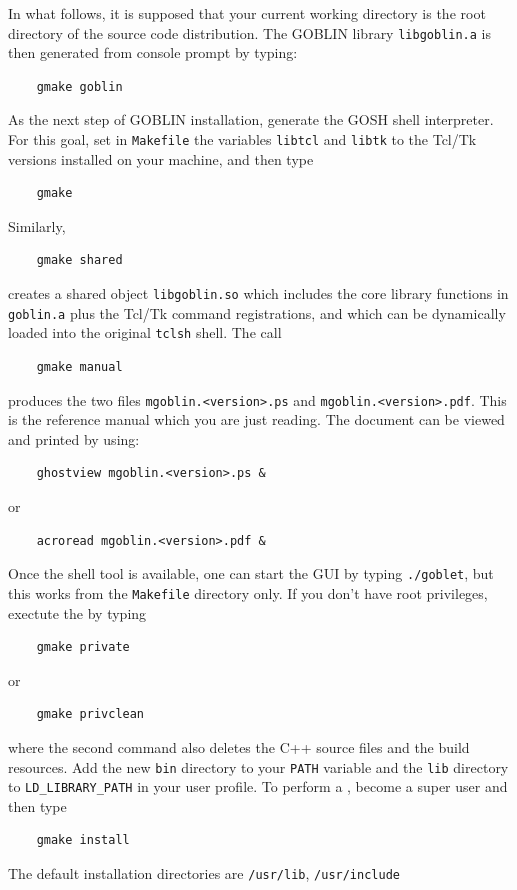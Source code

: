 \documentclass[a4paper,11pt,twoside]{book}
\begin{document}
\begin{multicols}{2}
In what follows, it is supposed that your current working directory is the root
directory of the source code distribution. The GOBLIN library \verb/libgoblin.a/
is then generated from console prompt by typing:
\begin{verbatim}
    gmake goblin
\end{verbatim}
As the next step of GOBLIN installation, generate the GOSH shell interpreter.
For this goal, set in \verb/Makefile/ the variables \verb/libtcl/ and
\verb/libtk/ to the Tcl/Tk versions installed on your machine, and then type
\begin{verbatim}
    gmake
\end{verbatim}
Similarly,
\begin{verbatim}
    gmake shared
\end{verbatim}
creates a shared object \verb/libgoblin.so/ which includes the core library
functions in \verb/goblin.a/ plus the Tcl/Tk command registrations, and which
can be dynamically loaded into the original \verb/tclsh/ shell. The call
\begin{verbatim}
    gmake manual
\end{verbatim}
produces the two files \verb/mgoblin.<version>.ps/ and
\verb/mgoblin.<version>.pdf/. This is the reference manual which
you are just reading. The document can be viewed and printed by using:
\begin{verbatim}
    ghostview mgoblin.<version>.ps &
\end{verbatim}
or
\begin{verbatim}
    acroread mgoblin.<version>.pdf &
\end{verbatim}
Once the shell tool is available, one can start the GUI by typing
\verb!./goblet!, but this works from the \verb/Makefile/ directory only. If you
don't have root privileges, exectute the  by typing
\begin{verbatim}
    gmake private
\end{verbatim}
or
\begin{verbatim}
    gmake privclean
\end{verbatim}
where the second command also deletes the C++ source files and the build
resources. Add the new \verb/bin/ directory to your \verb/PATH/ variable and
the \verb/lib/ directory to \verb/LD_LIBRARY_PATH/ in your user profile.
To perform a , become a super user and then type
\begin{verbatim}
    gmake install
\end{verbatim}
The default installation directories are \verb!/usr/lib!, \verb!/usr/include!

\end{multicols}
\end{document}
